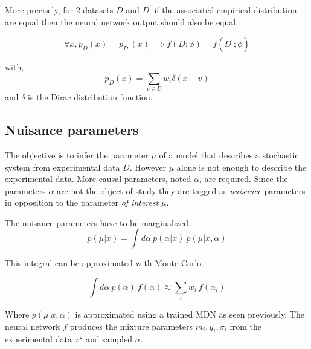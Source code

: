 More precisely, for 2 datasets $D$ and $D^\prime$ if the associated empirical distribution are equal then the neural network output should also be equal.

\begin{equation}
    \forall x, p_D(x) = p_{D^\prime}(x) \implies f(D; \phi) = f(D^\prime; \phi)
\end{equation}

with,
\begin{equation}
    p_D(x) = \sum_{v \in D} w_i \delta (x - v)
\end{equation}
and $\delta$ is the Dirac distribution function.


\subsection{Nuisance parameters}

The objective is to infer the parameter $\mu$ of a model that describes a stochastic system from experimental data $D$.
However $\mu$ alone is not enough to describe the experimental data.
More causal parameters, noted $\alpha$, are required.
Since the parameters $\alpha$ are not the object of study they are tagged as \emph{nuisance} parameters in opposition to the parameter \emph{of interest} $\mu$.

The nuisance parameters have to be marginalized.
\begin{equation}
    p(\mu | x) = \int d\alpha ~ p(\alpha | x) ~ p(\mu | x, \alpha)
\end{equation}

This integral can be approximated with Monte Carlo.

\begin{equation}
  \int d\alpha ~ p(\alpha) ~ f(\alpha)
  \approx \sum_i w_i ~ f(\alpha_i)
\end{equation}

Where $p(\mu | x, \alpha)$ is approximated using a trained MDN as seen previously.
The neural network $f$ produces the mixture parameters $m_i, y_i, \sigma_i$ from the experimental data $x^\star$ and sampled $\alpha$.

